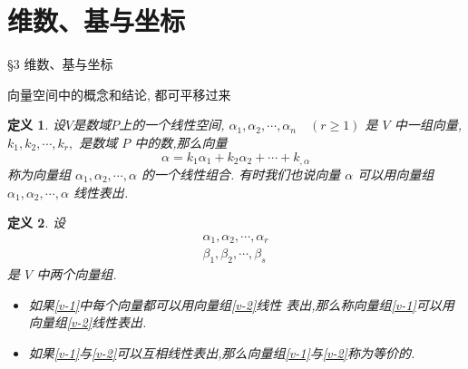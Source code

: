 \documentclass[13pt]{beamer}
\newtheorem*{defi}{定义}
\begin{document}
\section{维数、基与坐标}
\begin{frame}{\S 3  维数、基与坐标}

向量空间中的概念和结论, 都可平移过来 


\begin{defi}
设$V$是数域$P$上的一个线性空间, 
${\alpha}_{1}, {\alpha}_{2}, \cdots, {\alpha}_n \quad (r \geqslant 1)$ 是 $V$ 中一组向量, $k_{1}, k_{2}, \cdots, k_{r},$ 是数域 $P$ 中的数,那么向量
\[
{\alpha}=k_{1} {\alpha}_{1}+k_{2} {\alpha}_{2}+\cdots+k_{, \alpha}
\]
称为向量组 ${\alpha}_{1}, {\alpha}_{2}, \cdots, {\alpha}$ 的一个\alert{线性组合}. 有时我们也说向量 ${\alpha}$
可以用向量组 ${\alpha}_{1}, {\alpha}_{2}, \cdots, {\alpha}$ \alert{线性表出}.
\end{defi}
\end{frame}


\begin{frame}
\begin{defi}
设
\begin{align}
{\alpha}_{1}, {\alpha}_{2}, \cdots, {\alpha}_{r}  \label{v-1}\\
{\beta}_{1}, {\beta}_{2}, \cdots, {\beta}_{s}  \label{v-2}
\end{align}
是 $V$ 中两个向量组.
\begin{itemize}
\item 如果\eqref{v-1}中每个向量都可以用向量组\eqref{v-2}线性 表出,那么称向量组\eqref{v-1}可以用向量组\eqref{v-2}\alert{线性表出}.
\item 如果\eqref{v-1}与\eqref{v-2}可以互相线性表出,那么向量组\eqref{v-1}与\eqref{v-2}称为\alert{等价的}. 	
\end{itemize}
\end{defi}
\end{frame}
\end{document}
